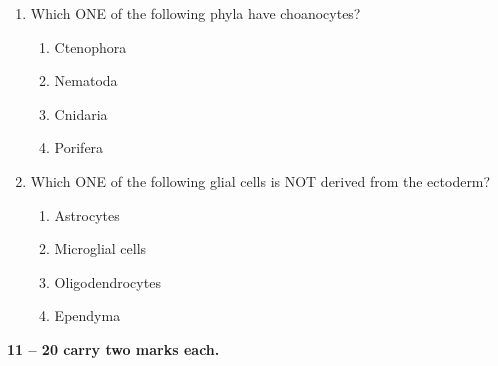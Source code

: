 \documentclass[journal,12pt,onecolumn]{IEEEtran}
\begin{document}
\begin{enumerate}[label=\arabic*.]
\item Which ONE of the following phyla have choanocytes?

\begin{multicols}{4}
\begin{enumerate}[label=(\Alph*)]
\item Ctenophora
\item Nematoda
\item Cnidaria
\item Porifera
\end{enumerate}
\end{multicols}

\item Which ONE of the following glial cells is NOT derived from the ectoderm?

\begin{multicols}{4}
\begin{enumerate}[label=(\Alph*)]
\item Astrocytes
\item Microglial cells
\item Oligodendrocytes
\item Ependyma
\end{enumerate}
\end{multicols}

\end{enumerate}

\vspace{0.5cm}

\noindent \textbf{ 11 -- 20 carry two marks each.}
\end{document}

